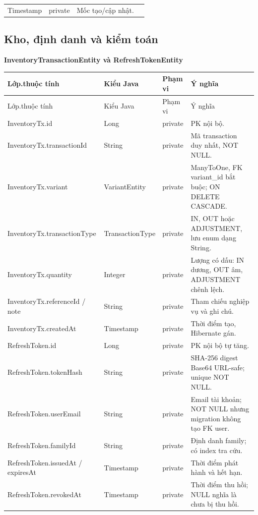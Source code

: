 \documentclass[12pt,a4paper,oneside]{report}
\newcommand{\ClassTableTitle}[1]{\par\medskip\noindent\textbf{#1}\par\smallskip}
\begin{document}
\begin{longtable}{@{}D{3.25cm}D{3.35cm}D{1.35cm}D{6.75cm}@{}}
Timestamp & private & Mốc tạo/cập nhật.\\\end{longtable}\normalsize

\subsection{Kho, định danh và kiểm toán}
\ClassTableTitle{InventoryTransactionEntity và RefreshTokenEntity}
\small\begin{longtable}{@{}D{3.25cm}D{3.35cm}D{1.35cm}D{6.75cm}@{}}\toprule Lớp.thuộc tính & Kiểu Java & Phạm vi & Ý nghĩa\\\midrule\endfirsthead\toprule Lớp.thuộc tính & Kiểu Java & Phạm vi & Ý nghĩa\\\midrule\endhead\bottomrule\endfoot
InventoryTx.\allowbreak id & Long & private & PK nội bộ.\\InventoryTx.\allowbreak transactionId & String & private & Mã transaction duy nhất, NOT NULL.\\InventoryTx.\allowbreak variant & VariantEntity & private & ManyToOne, FK variant\_id bắt buộc; ON DELETE CASCADE.\\InventoryTx.\allowbreak transactionType & TransactionType & private & IN, OUT hoặc ADJUSTMENT, lưu enum dạng String.\\InventoryTx.\allowbreak quantity & Integer & private & Lượng có dấu: IN dương, OUT âm, ADJUSTMENT chênh lệch.\\InventoryTx.\allowbreak referenceId / note & String & private & Tham chiếu nghiệp vụ và ghi chú.\\InventoryTx.\allowbreak createdAt & Timestamp & private & Thời điểm tạo, Hibernate gán.\\RefreshToken.\allowbreak id & Long & private & PK nội bộ tự tăng.\\RefreshToken.\allowbreak tokenHash & String & private & SHA-256 digest Base64 URL-safe; unique NOT NULL.\\RefreshToken.\allowbreak userEmail & String & private & Email tài khoản; NOT NULL nhưng migration không tạo FK user.\\RefreshToken.\allowbreak familyId & String & private & Định danh family; có index tra cứu.\\RefreshToken.\allowbreak issuedAt / expiresAt & Timestamp & private & Thời điểm phát hành và hết hạn.\\RefreshToken.\allowbreak revokedAt & Timestamp & private & Thời điểm thu hồi; NULL nghĩa là chưa bị thu hồi.\\\end{longtable}\normalsize
\end{document}
